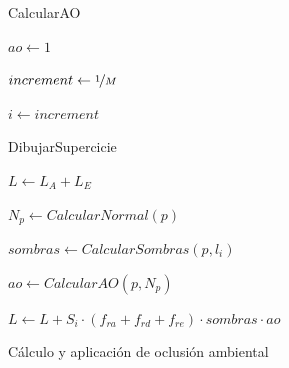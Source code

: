\begin{figure}
    \centering
    \begin{algorithm}[H]
        \caption{CalcularAO}
            $ao \gets 1$
                    
            $increment \gets \nicefrac{1}{M}$
            
            $i\gets increment$
        
                
    \end{algorithm}
    
    \begin{algorithm}[H]
        \caption{DibujarSupercicie}\label{alg:fsFinal}
            $L \gets L_A + L_E$ 
             {
    
                
                $N_p \gets CalcularNormal(p)$
                
                $sombras \gets CalcularSombras(p, l_i)$
                
                $ao \gets CalcularAO(p, N_p)$
    
                $L \gets L + S_i\cdot (f_{ra} + f_{rd} + f_{re})\cdot sombras \cdot ao$
            }
    
    \end{algorithm}
    
    \caption{Cálculo y aplicación de oclusión ambiental}
    \label{fig:dibujarAO}
\end{figure}


